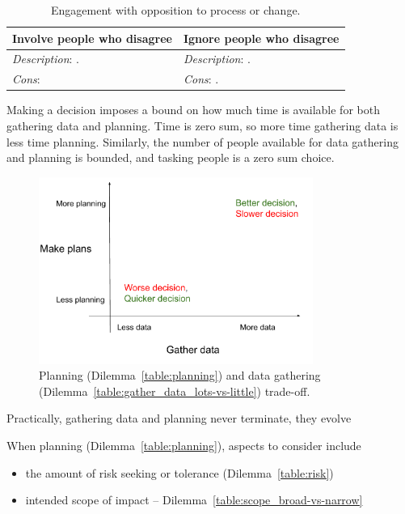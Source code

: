 \begin{center}
\begin{table}[ht]
\begin{tabular}{ | m{\dilemmatablewidth}| m{\dilemmatablewidth} | } 
  \hline
  \textbf{Involve people who disagree} & 
  \textbf{Ignore people who disagree} \\ 
  \hline
  \textit{Description}: . & 
  \textit{Description}: . \\ 
  \hline
  \textit{Cons}:  & 
  \textit{Cons}: . \\  
  \hline
\end{tabular}
\caption{Engagement with opposition to process or change.
}
\label{table:opposition}
\end{table}
\end{center}

Making a decision imposes a bound on how much time is available for both gathering data and planning. Time is zero sum, so more time gathering data is less time planning. Similarly, the number of people available for data gathering and planning is bounded, and tasking people is a zero sum choice.

\begin{figure}[ht]
    \centering
    \includegraphics[width=0.8\textwidth]{images/planning_and_data_gathering.pdf}
    \caption{Planning (Dilemma~\ref{table:planning}) and data gathering (Dilemma~\ref{table:gather_data_lots-vs-little}) trade-off.}
    \label{fig:pareto_frontier}
\end{figure}

Practically, gathering data and planning never terminate, they evolve 




When planning (Dilemma~\ref{table:planning}), aspects to consider include
\begin{itemize}
    \item the amount of risk seeking or tolerance (Dilemma~\ref{table:risk})
    \item intended scope of impact -- Dilemma~\ref{table:scope_broad-vs-narrow}
\end{itemize}

